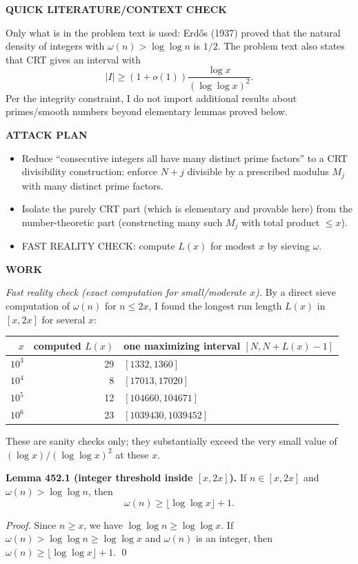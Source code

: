 \textbf{QUICK LITERATURE/CONTEXT CHECK}

Only what is in the problem text is used: Erd\H{o}s (1937) proved that the natural density of integers with $\omega(n)>\log\log n$ is $1/2$. The problem text also states that CRT gives an interval with
\[
|I|\ge (1+o(1))\frac{\log x}{(\log\log x)^2}.
\]
Per the integrity constraint, I do not import additional results about primes/smooth numbers beyond elementary lemmas proved below.

\textbf{ATTACK PLAN}

\begin{itemize}
\item Reduce ``consecutive integers all have many distinct prime factors'' to a CRT divisibility construction: enforce $N+j$ divisible by a prescribed modulus $M_j$ with many distinct prime factors.
\item Isolate the purely CRT part (which is elementary and provable here) from the number-theoretic part (constructing many such $M_j$ with total product $\le x$).
\item FAST REALITY CHECK: compute $L(x)$ for modest $x$ by sieving $\omega$.
\end{itemize}

\textbf{WORK}

\emph{Fast reality check (exact computation for small/moderate $x$).}
By a direct sieve computation of $\omega(n)$ for $n\le 2x$, I found the longest run length $L(x)$ in $[x,2x]$ for several $x$:
\begin{center}
\begin{tabular}{r|r|l}
$x$ & computed $L(x)$ & one maximizing interval $[N,N+L(x)-1]$ \\\hline
$10^3$ & 29 & $[1332,1360]$\\
$10^4$ & 8  & $[17013,17020]$\\
$10^5$ & 12 & $[104660,104671]$\\
$10^6$ & 23 & $[1039430,1039452]$\\
\end{tabular}
\end{center}
These are sanity checks only; they substantially exceed the very small value of $(\log x)/(\log\log x)^2$ at these $x$.

\medskip

\textbf{Lemma 452.1 (integer threshold inside $[x,2x]$).}
If $n\in[x,2x]$ and $\omega(n)>\log\log n$, then
\[
\omega(n)\ge \big\lfloor \log\log x\big\rfloor+1.
\]

\emph{Proof.}
Since $n\ge x$, we have $\log\log n\ge \log\log x$. If $\omega(n)>\log\log n\ge \log\log x$ and $\omega(n)$ is an integer, then $\omega(n)\ge \lfloor \log\log x\rfloor+1$.
\qed


